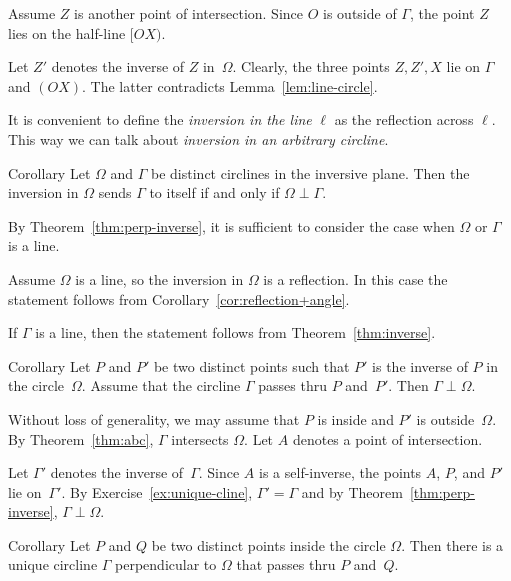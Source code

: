 Assume $Z$ is another point of intersection.
Since $O$ is outside of $\Gamma$, 
the point $Z$ lies on the half-line $[OX)$.

Let $Z'$ denotes the inverse of $Z$ in~$\Omega$.
Clearly, the three points $Z, Z', X$ lie on $\Gamma$ and $(OX)$.
The latter  contradicts Lemma~\ref{lem:line-circle}.
\qeds 

It is convenient to define the 
\emph{inversion in the line} $\ell$
as the reflection across $\ell$.
This way we can talk about \emph{inversion in an arbitrary circline}.

\begin{thm}{Corollary}\label{cor:perp-inverse-clines}
Let $\Omega$  and $\Gamma$ be distinct circlines in the inversive plane.
Then
the inversion in $\Omega$ sends $\Gamma$ to itself if and only if $\Omega\perp\Gamma$.
\end{thm}

By Theorem~\ref{thm:perp-inverse}, it is sufficient to consider the case when $\Omega$ or $\Gamma$ is a line.

Assume $\Omega$ is a line, so the inversion in $\Omega$ is a reflection.
In this case the statement follows from Corollary~\ref{cor:reflection+angle}.

If $\Gamma$ is a line, 
then the statement follows from Theorem~\ref{thm:inverse}.
\qeds

\begin{thm}{Corollary}\label{cor:perp-inverse}
Let $P$ and $P'$ be two distinct points
such that $P'$ is the inverse of $P$ in the circle~$\Omega$.
Assume that the circline $\Gamma$ passes thru $P$ and~$P'$.
Then $\Gamma\perp\Omega$.
\end{thm}

Without loss of generality, we may assume that $P$ is inside and $P'$ is outside~$\Omega$.
By Theorem~\ref{thm:abc}, $\Gamma$ intersects $\Omega$.
Let $A$ denotes a point of intersection.

Let $\Gamma'$ denotes the inverse of~$\Gamma$.
Since $A$ is a self-inverse, the points $A$, $P$, and $P'$ lie on~$\Gamma'$.
By Exercise~\ref{ex:unique-cline},
$\Gamma'=\Gamma$
and by Theorem~\ref{thm:perp-inverse}, $\Gamma\perp\Omega$.
\qeds

\begin{thm}{Corollary}\label{cor:h-line} 
Let $P$ and $Q$ be two distinct points inside the circle $\Omega$.
Then there is a unique circline $\Gamma$ perpendicular to $\Omega$ that passes thru $P$ and~$Q$.  
\end{thm}

